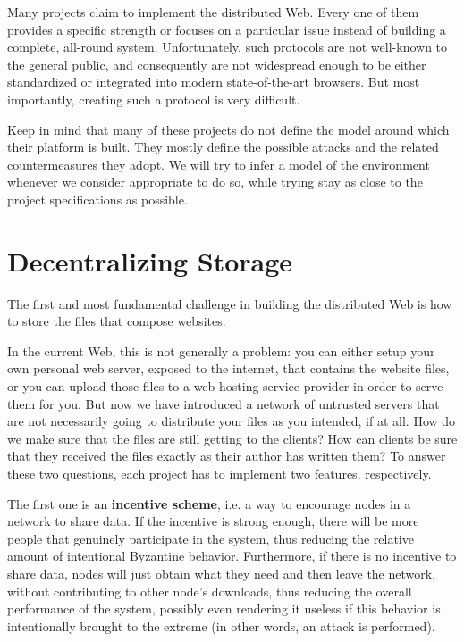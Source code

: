 \documentclass[mscthesis]{usiinfthesis}
\begin{document}
Many projects claim to implement the distributed Web. Every one of them provides a specific strength or focuses on a particular issue instead of building a complete, all-round system.
Unfortunately, such protocols are not well-known to the general public, and consequently are not widespread enough to be either standardized or integrated into modern state-of-the-art browsers.
But most importantly, creating such a protocol is very difficult.

Keep in mind that many of these projects do not define the model around which their platform is built. They mostly define the possible attacks and the related countermeasures they adopt. We will try to infer a model of the environment whenever we consider appropriate to do so, while trying stay as close to the project specifications as possible.


\chapter{Decentralizing Storage}

The first and most fundamental challenge in building the distributed Web is how to store the files that compose websites.

In the current Web, this is not generally a problem: you can either setup your own personal web server, exposed to the internet, that contains the website files, or you can upload those files to a web hosting service provider in order to serve them for you.
But now we have introduced a network of untrusted servers that are not necessarily going to distribute your files as you intended, if at all. How do we make sure that the files are still getting to the clients? How can clients be sure that they received the files exactly as their author has written them? To answer these two questions, each project has to implement two features, respectively.

The first one is an \textbf{incentive scheme}, i.e. a way to encourage nodes in a network to share data. If the incentive is strong enough, there will be more people that genuinely participate in the system, thus reducing the relative amount of intentional Byzantine behavior. Furthermore, if there is no incentive to share data, nodes will just obtain what they need and then leave the network, without contributing to other node's downloads, thus reducing the overall performance of the system, possibly even rendering it useless if this behavior is intentionally brought to the extreme (in other words, an attack is performed).
\end{document}

